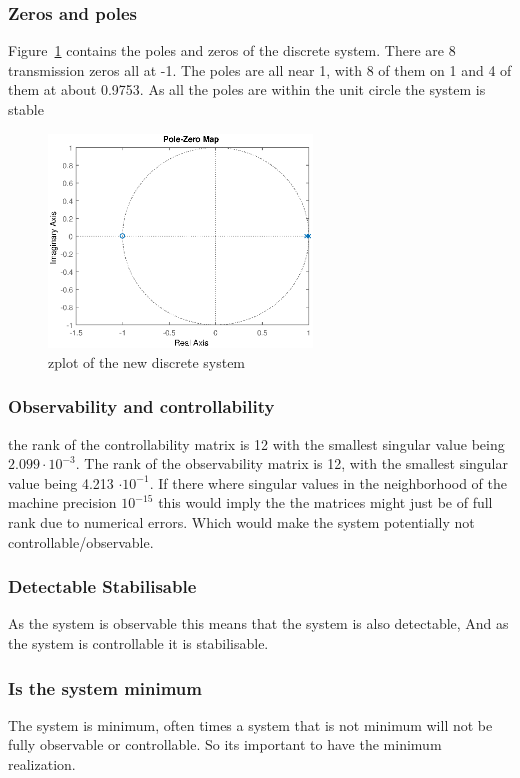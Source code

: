 \subsubsection{Zeros and poles}
Figure~\ref{fig:zplot_disc} contains the poles and zeros of the discrete system. There are 8 transmission zeros all at -1. The poles are all near 1, with 8 of them on 1 and 4 of them at about 0.9753. As all the poles are within the unit circle the system is stable
\begin{figure}[H]
	\centering
	\includegraphics[width=7cm]{./img/discrete/zplot.eps}
	\caption{zplot of the new discrete system}
	\label{fig:zplot_disc}
\end{figure}

\subsubsection{Observability and controllability} 
the rank of the controllability matrix is 12 with the smallest singular value being $2.099 \cdot 10^{-3}$. The rank of the observability matrix is 12, with the smallest singular value being 4.213 $\cdot 10^{-1}$. If there where singular values in the neighborhood of the machine precision $10^{-15}$ this would imply the the matrices might just be of full rank due to numerical errors. Which would make the system potentially not controllable/observable.

\subsubsection{Detectable Stabilisable}
As the system is observable this means that the system is also detectable, And as the system is controllable it is stabilisable. 

\subsubsection{Is the system minimum}
The system is minimum, often times a system that is not minimum will not be fully observable or controllable. So its important to have the minimum realization.

